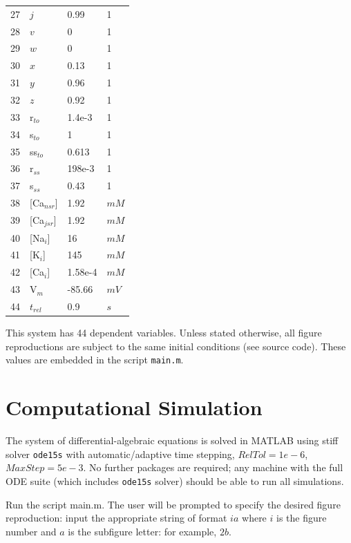 \documentclass[fleqn,10pt]{physiome}
\begin{document}
\begin{table}[ht]
\begin{tabular}{|l|l|l|l|}
    27 & $j$ & 0.99 & 1 \\ 
    28 & $v$ & 0 & 1 \\ 
    29 & $w$ & 0 & 1 \\ 
    30 & $x$ & 0.13 & 1 \\ 
    31 & $y$ & 0.96 & 1 \\ 
    32 & $z$ & 0.92 & 1 \\ 
    33 & r$_{to}$ & 1.4e-3 & 1 \\ 
    34 & s$_{to}$ & 1 & 1 \\ 
    35 & ss$_{to}$ & 0.613 & 1 \\ 
    36 & r$_{ss}$ & 198e-3 & 1 \\ 
    37 & s$_{ss}$ & 0.43 & 1 \\ 
    38 & [Ca$_{nsr}$] & 1.92 & $mM$ \\ 
    39 & [Ca$_{jsr}$] & 1.92 & $mM$ \\ 
    40 & [Na$_i$] & 16 & $mM$ \\ 
    41 & [K$_i$] & 145 & $mM$ \\ 
    42 & [Ca$_i$] & 1.58e-4 & $mM$ \\ 
    43 & V$_m$ & -85.66 & $mV$\\ 
    44 & $t_{rel}$ & 0.9 & $s$ \\ 
    \hline
    \end{tabular}
    \end{table}
\fi

This system has 44 dependent variables. Unless stated otherwise, all figure reproductions are subject to the same initial conditions (see source code). These values are embedded in the script \texttt{main.m}.

\section{Computational Simulation}

The system of differential-algebraic equations is solved in MATLAB using stiff solver \texttt{ode15s} \citep{shampine1997matlab} with automatic/adaptive time stepping, $RelTol = 1e-6$, $MaxStep = 5e-3$. No further packages are required; any machine with the full ODE suite (which includes \texttt{ode15s} solver) should be able to run all simulations.

Run the script main.m. The user will be prompted to specify the desired figure reproduction: input the appropriate string of format $ia$ where $i$ is the figure number and $a$ is the subfigure letter: for example, $2b$. 
\end{document}
